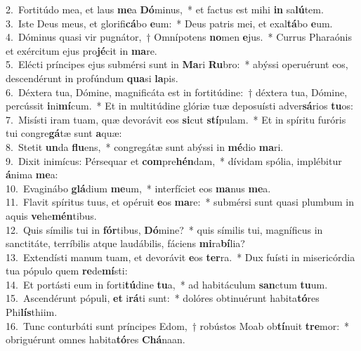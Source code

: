 {2.~}Fortitúdo mea, et laus \textbf{me}a \textbf{Dó}minus,~* et factus est mihi \textbf{in} sa\textbf{lú}tem.\\
{3.~}Iste Deus meus, et glorifi\textbf{cá}bo \textbf{e}um:~* Deus patris mei, et exal\textbf{tá}bo \textbf{e}um.\\
{4.~}Dóminus quasi vir pugnátor,~† Omnípotens \textbf{no}men \textbf{e}jus.~* Currus Pharaónis et exércitum ejus pro\textbf{jé}cit in \textbf{ma}re.\\
{5.~}Elécti príncipes ejus submérsi sunt in \textbf{Ma}ri \textbf{Ru}bro:~* abýssi operuérunt eos, descendérunt in profúndum \textbf{qua}si \textbf{la}pis.\\
{6.~}Déxtera tua, Dómine, magnificáta est in fortitúdine:~† déxtera tua, Dómine, percússit \textbf{i}ni\textbf{mí}cum.~* Et in multitúdine glóriæ tuæ deposuísti adver\textbf{sá}rios \textbf{tu}os:\\
{7.~}Misísti iram tuam, quæ devorávit eos \textbf{si}cut \textbf{stí}pulam.~* Et in spíritu furóris tui congre\textbf{gá}tæ sunt \textbf{a}quæ:\\
{8.~}Stetit \textbf{un}da \textbf{flu}ens,~* congregátæ sunt abýssi in \textbf{mé}dio \textbf{ma}ri.\\
{9.~}Dixit inimícus: Pérsequar et \textbf{com}pre\textbf{hén}dam,~* dívidam spólia, implébitur \textbf{á}nima \textbf{me}a:\\
{10.~}Evaginábo \textbf{glá}dium \textbf{me}um,~* interfíciet eos \textbf{ma}nus \textbf{me}a.\\
{11.~}Flavit spíritus tuus, et opéruit \textbf{e}os \textbf{ma}re:~* submérsi sunt quasi plumbum in aquis \textbf{ve}he\textbf{mén}tibus.\\
{12.~}Quis símilis tui in \textbf{fór}tibus, \textbf{Dó}mine?~* quis símilis tui, magníficus in sanctitáte, terríbilis atque laudábilis, fáciens \textbf{mi}ra\textbf{bí}lia?\\
{13.~}Extendísti manum tuam, et devorávit \textbf{e}os \textbf{ter}ra.~* Dux fuísti in misericórdia tua pópulo quem \textbf{re}de\textbf{mí}sti:\\
{14.~}Et portásti eum in forti\textbf{tú}dine \textbf{tu}a,~* ad habitáculum \textbf{san}ctum \textbf{tu}um.\\
{15.~}Ascendérunt pópuli, \textbf{et} i\textbf{rá}ti sunt:~* dolóres obtinuérunt habita\textbf{tó}res Phi\textbf{lís}thiim.\\
{16.~}Tunc conturbáti sunt príncipes Edom,~† robústos Moab ob\textbf{tí}nuit \textbf{tre}mor:~* obriguérunt omnes habita\textbf{tó}res \textbf{Chá}naan.\\
